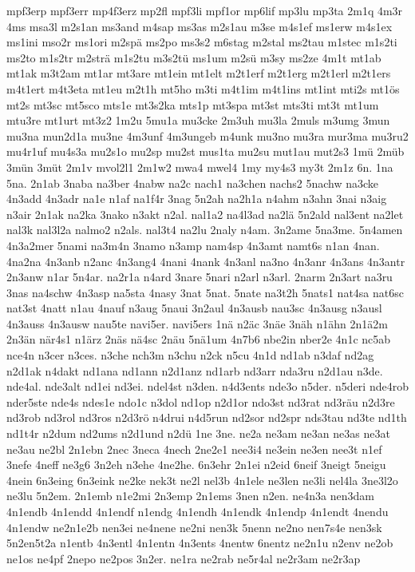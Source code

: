 {mpf3erp
mpf3err
mp4f3erz
mp2fl
mpf3li
mpf1or
mp6lif
mp3lu
mp3ta
2m1q
4m3r
4ms
msa3l
m2s1an
ms3and
m4sap
ms3as
m2s1au
m3se
m4s1ef
ms1erw
m4s1ex
ms1ini
mso2r
ms1ori
m2spä
ms2po
ms3s2
m6stag
m2stal
ms2tau
m1stec
m1s2ti
ms2to
m1s2tr
m2strä
m1s2tu
m3s2tü
ms1um
m2sü
m3sy
ms2ze
4m1t
mt1ab
mt1ak
m3t2am
mt1ar
mt3are
mt1ein
mt1elt
m2t1erf
m2t1erg
m2t1erl
m2t1ers
m4t1ert
m4t3eta
mt1eu
m2t1h
mt5ho
m3ti
m4t1im
m4t1ins
mt1int
mti2s
mt1ös
mt2s
mt3sc
mt5sco
mts1e
mt3s2ka
mts1p
mt3spa
mt3st
mts3ti
mt3t
mt1um
mtu3re
mt1urt
mt3z2
1m2u
5mu1a
mu3cke
2m3uh
mu3la
2muls
m3umg
3mun
mu3na
mun2d1a
mu3ne
4m3unf
4m3ungeb
m4unk
mu3no
mu3ra
mur3ma
mu3ru2
mu4r1uf
mu4s3a
mu2s1o
mu2sp
mu2st
mus1ta
mu2su
mut1au
mut2s3
1mü
2müb
3mün
3müt
2m1v
mvol2l1
2m1w2
mwa4
mwel4
1my
my4s3
my3t
2m1z
6n.
1na
5na.
2n1ab
3naba
na3ber
4nabw
na2c
nach1
na3chen
nachs2
5nachw
na3cke
4n3add
4n3adr
na1e
n1af
na1f4r
3nag
5n2ah
na2h1a
n4ahm
n3ahn
3nai
n3aig
n3air
2n1ak
na2ka
3nako
n3akt
n2al.
nal1a2
na4l3ad
na2lä
5n2ald
nal3ent
na2let
nal3k
nal3l2a
nalmo2
n2als.
nal3t4
na2lu
2naly
n4am.
3n2ame
5na3me.
5n4amen
4n3a2mer
5nami
na3m4n
3namo
n3amp
nam4sp
4n3amt
namt6s
n1an
4nan.
4na2na
4n3anb
n2anc
4n3ang4
4nani
4nank
4n3anl
na3no
4n3anr
4n3ans
4n3antr
2n3anw
n1ar
5n4ar.
na2r1a
n4ard
3nare
5nari
n2arl
n3arl.
2narm
2n3art
na3ru
3nas
na4schw
4n3asp
na5sta
4nasy
3nat
5nat.
5nate
na3t2h
5nats1
nat4sa
nat6sc
nat3st
4natt
n1au
4nauf
n3aug
5naui
3n2aul
4n3ausb
nau3sc
4n3ausg
n3ausl
4n3auss
4n3ausw
nau5te
navi5er.
navi5ers
1nä
n2äc
3näe
3näh
n1ähn
2n1ä2m
2n3än
när4s1
n1ärz
2näs
nä4sc
2näu
5nä1um
4n7b6
nbe2in
nber2e
4n1c
nc5ab
nce4n
n3cer
n3ces.
n3che
nch3m
n3chu
n2ck
n5cu
4n1d
nd1ab
n3daf
nd2ag
n2d1ak
n4dakt
nd1ana
nd1ann
n2d1anz
nd1arb
nd3arr
nda3ru
n2d1au
n3de.
nde4al.
nde3alt
nd1ei
nd3ei.
ndel4st
n3den.
n4d3ents
nde3o
n5der.
n5deri
nde4rob
nder5ste
nde4s
ndes1e
ndo1c
n3dol
nd1op
n2d1or
ndo3st
nd3rat
nd3räu
n2d3re
nd3rob
nd3rol
nd3ros
n2d3rö
n4drui
n4d5run
nd2sor
nd2spr
nds3tau
nd3te
nd1th
nd1t4r
n2dum
nd2ums
n2d1und
n2dü
1ne
3ne.
ne2a
ne3am
ne3an
ne3as
ne3at
ne3au
ne2bl
2n1ebn
2nec
3neca
4nech
2ne2e1
nee3i4
ne3ein
ne3en
nee3t
n1ef
3nefe
4neff
ne3g6
3n2eh
n3ehe
4ne2he.
6n3ehr
2n1ei
n2eid
6neif
3neigt
5neigu
4nein
6n3eing
6n3eink
ne2ke
nek3t
ne2l
nel3b
4n1ele
ne3len
ne3li
nel4la
3ne3l2o
ne3lu
5n2em.
2n1emb
n1e2mi
2n3emp
2n1ems
3nen
n2en.
ne4n3a
nen3dam
4n1endb
4n1endd
4n1endf
n1endg
4n1endh
4n1endk
4n1endp
4n1endt
4nendu
4n1endw
ne2n1e2b
nen3ei
ne4nene
ne2ni
nen3k
5nenn
ne2no
nen7s4e
nen3sk
5n2en5t2a
n1entb
4n3entl
4n1entn
4n3ents
4nentw
6nentz
ne2n1u
n2env
ne2ob
ne1os
ne4pf
2nepo
ne2pos
3n2er.
ne1ra
ne2rab
ne5r4al
ne2r3am
ne2r3ap
}
